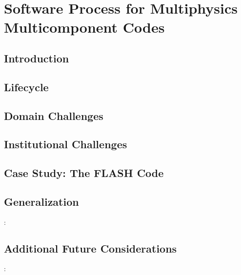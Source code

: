 \documentclass[sunil1]{sunil} %
\begin{document}

\chapter{Software Process for Multiphysics Multicomponent Codes}
\section {Introduction} 

\section{Lifecycle}

\section{Domain Challenges} 

\section{Institutional Challenges}

\section{Case Study: The FLASH Code}

\section{Generalization} : 

\section{Additional Future Considerations}: 



\end{document}
